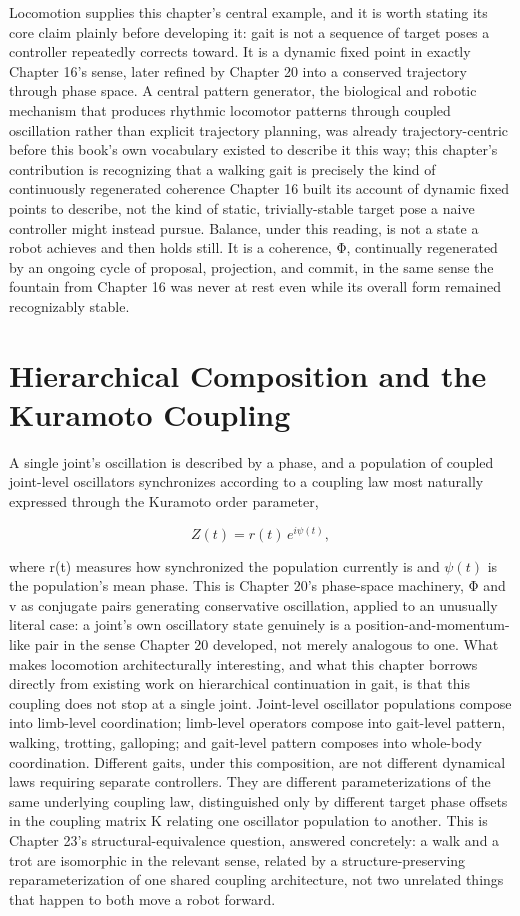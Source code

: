 Locomotion supplies this chapter's central example, and it is worth stating its core claim plainly before developing it: gait is not a sequence of target poses a controller repeatedly corrects toward. It is a dynamic fixed point in exactly Chapter 16's sense, later refined by Chapter 20 into a conserved trajectory through phase space. A central pattern generator, the biological and robotic mechanism that produces rhythmic locomotor patterns through coupled oscillation rather than explicit trajectory planning, was already trajectory-centric before this book's own vocabulary existed to describe it this way; this chapter's contribution is recognizing that a walking gait is precisely the kind of continuously regenerated coherence Chapter 16 built its account of dynamic fixed points to describe, not the kind of static, trivially-stable target pose a naive controller might instead pursue. Balance, under this reading, is not a state a robot achieves and then holds still. It is a coherence, Φ, continually regenerated by an ongoing cycle of proposal, projection, and commit, in the same sense the fountain from Chapter 16 was never at rest even while its overall form remained recognizably stable.

\section{Hierarchical Composition and the Kuramoto Coupling}

A single joint's oscillation is described by a phase, and a population of coupled joint-level oscillators synchronizes according to a coupling law most naturally expressed through the Kuramoto order parameter,

\[ Z(t) = r(t)\, e^{i\psi(t)}, \]

where r(t) measures how synchronized the population currently is and \(\psi(t)\) is the population's mean phase. This is Chapter 20's phase-space machinery, Φ and v as conjugate pairs generating conservative oscillation, applied to an unusually literal case: a joint's own oscillatory state genuinely is a position-and-momentum-like pair in the sense Chapter 20 developed, not merely analogous to one. What makes locomotion architecturally interesting, and what this chapter borrows directly from existing work on hierarchical continuation in gait, is that this coupling does not stop at a single joint. Joint-level oscillator populations compose into limb-level coordination; limb-level operators compose into gait-level pattern, walking, trotting, galloping; and gait-level pattern composes into whole-body coordination. Different gaits, under this composition, are not different dynamical laws requiring separate controllers. They are different parameterizations of the same underlying coupling law, distinguished only by different target phase offsets in the coupling matrix K relating one oscillator population to another. This is Chapter 23's structural-equivalence question, answered concretely: a walk and a trot are isomorphic in the relevant sense, related by a structure-preserving reparameterization of one shared coupling architecture, not two unrelated things that happen to both move a robot forward.

